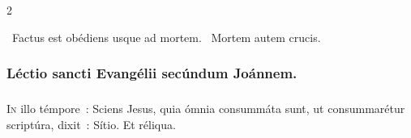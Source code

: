 \documentclass[9pt,twoside]{extarticle}
\begin{document}
\begin{multicols}{2}
%
%
%
%
%
%
%
%
%
%
%
%
%
%
%
%
%
%
%
%

\begin{tightlist}{}
\item {}~Factus est obédiens usque ad mortem. ~Mortem autem crucis.
\end{tightlist}

\subsubsection*{\center Léctio sancti Evangélii secúndum Joánnem.}
\subsubsection*{\center {}}
\lettrine{I}n illo témpore~: Sciens Jesus, quia ómnia consummáta sunt, ut consummarétur scriptúra, dixit~: Sítio. Et réliqua.


\end{multicols}
\end{document}
